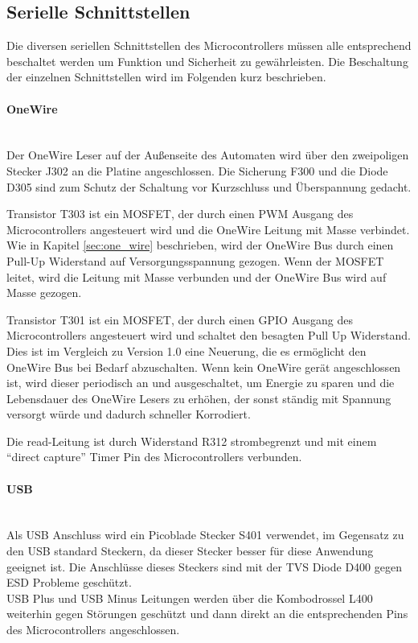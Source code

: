 \subsection{Serielle Schnittstellen}
Die diversen seriellen Schnittstellen des Microcontrollers müssen alle entsprechend beschaltet werden um Funktion und 
Sicherheit zu gewährleisten. Die Beschaltung der einzelnen Schnittstellen wird im Folgenden kurz beschrieben.

\paragraph{OneWire}\mbox{}\\
Der OneWire Leser auf der Außenseite des Automaten wird über den zweipoligen Stecker J302 an die Platine angeschlossen.
Die Sicherung F300 und die Diode D305 sind zum Schutz der Schaltung vor Kurzschluss und Überspannung gedacht. 

Transistor T303 ist ein \ac{MOSFET}, der durch einen \ac{PWM} Ausgang des Microcontrollers angesteuert wird und die OneWire
Leitung mit Masse verbindet. Wie in Kapitel \ref{sec:one_wire} beschrieben, wird der OneWire Bus durch einen Pull-Up Widerstand
auf Versorgungsspannung gezogen. Wenn der \ac{MOSFET} leitet, wird die Leitung mit Masse verbunden und der OneWire Bus wird
auf Masse gezogen.

Transistor T301 ist ein \ac{MOSFET}, der durch einen \ac{GPIO} Ausgang des Microcontrollers angesteuert wird und schaltet 
den besagten Pull Up Widerstand. Dies ist im Vergleich zu Version 1.0 eine Neuerung, die es ermöglicht den OneWire Bus
bei Bedarf abzuschalten. Wenn kein OneWire gerät angeschlossen ist, wird dieser periodisch an und ausgeschaltet, um Energie
zu sparen und die Lebensdauer des OneWire Lesers zu erhöhen, der sonst ständig mit Spannung versorgt würde und dadurch 
schneller Korrodiert.

Die read-Leitung ist durch Widerstand R312 strombegrenzt und mit einem \enquote{direct capture} Timer Pin des Microcontrollers
verbunden.  

\paragraph{\ac{USB}}\mbox{}\\
Als \ac{USB} Anschluss wird ein Picoblade Stecker S401 verwendet, im Gegensatz zu den \ac{USB} standard Steckern, da dieser 
Stecker besser für diese Anwendung geeignet ist. Die Anschlüsse dieses Steckers sind mit der TVS Diode D400 gegen ESD Probleme
geschützt. \\
\ac{USB} Plus und \ac{USB} Minus Leitungen werden über die Kombodrossel L400 weiterhin gegen Störungen geschützt und dann direkt 
an die entsprechenden Pins des Microcontrollers angeschlossen.

